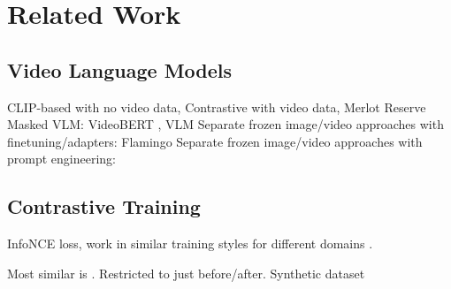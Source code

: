 \chapter{Related Work}
\label{chap:rel}

\section{Video Language Models}
\label{sec:vidlm}

CLIP-based \citep{radford2021clip} with no video data, 
Contrastive with video data, Merlot Reserve
Masked VLM: VideoBERT \citep{sun2019videobert}, VLM \citep{xu2021vlm}
Separate frozen image/video approaches with finetuning/adapters: Flamingo \citep{alayrac2022flamingo}
Separate frozen image/video approaches with prompt engineering: \citep{wang2022vidil, zeng2023socratic}


\section{Contrastive Training}
\label{sec:contrastive}

InfoNCE loss, work in similar training styles for different domains
\citep{momeni2023verbs, yuksekgonul2023when}.

Most similar is \cite{bagad2023testoftime}. Restricted to just before/after.
Synthetic dataset


